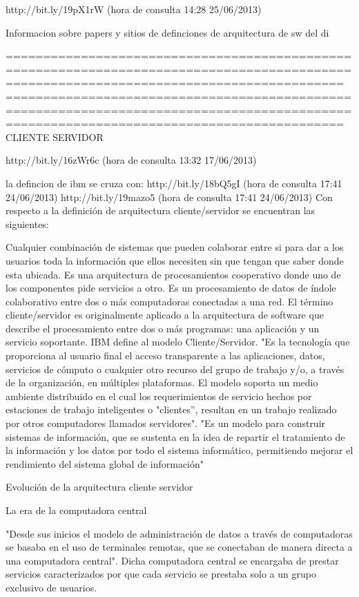 http://bit.ly/19pX1rW (hora de consulta 14:28 25/06/2013)

Informacion sobre papers y sitios de definciones de arquitectura de sw del di

=========================================================================================================================================
=========================================================================================================================================
CLIENTE SERVIDOR

http://bit.ly/16zWr6c (hora de consulta 13:32 17/06/2013)

la defincion de ibm se cruza con:
http://bit.ly/18bQ5gI (hora de consulta 17:41 24/06/2013)
http://bit.ly/19mazo5 (hora de consulta 17:41 24/06/2013)
Con respecto a la definición de arquitectura cliente/servidor se encuentran las siguientes:

    Cualquier combinación de sistemas que pueden colaborar entre si para dar a los usuarios toda la información que 
     ellos necesiten sin que tengan que saber donde esta ubicada.
    Es una arquitectura de procesamientos cooperativo donde uno de los componentes pide servicios a otro.
    Es un procesamiento de datos de índole colaborativo entre dos o más computadoras conectadas a una red.
    El término cliente/servidor es originalmente aplicado a la arquitectura de software que describe el procesamiento 
     entre dos o más programas: una aplicación y un servicio soportante.
    IBM define al modelo Cliente/Servidor. "Es la tecnología que proporciona al usuario final el acceso transparente a las 
     aplicaciones, datos, servicios de cómputo o cualquier otro recurso del grupo de trabajo y/o, a través de la organización, 
     en múltiples plataformas. El modelo soporta un medio ambiente distribuido en el cual los requerimientos de servicio hechos 
     por estaciones de trabajo inteligentes o "clientes'', resultan en un trabajo realizado por otros computadores llamados 
     servidores".
    "Es un modelo para construir sistemas de información, que se sustenta en la idea de repartir el tratamiento de la información y 
    los datos por todo el sistema informático, permitiendo mejorar el rendimiento del sistema global de información"
    
Evolución de la arquitectura cliente servidor

La era de la computadora central

"Desde sus inicios el modelo de administración de datos a través de computadoras se basaba en el uso de terminales remotas, 
que se conectaban de manera directa a una computadora central". Dicha computadora central se encargaba de prestar servicios 
caracterizados por que cada servicio se prestaba solo a un grupo exclusivo de usuarios.

